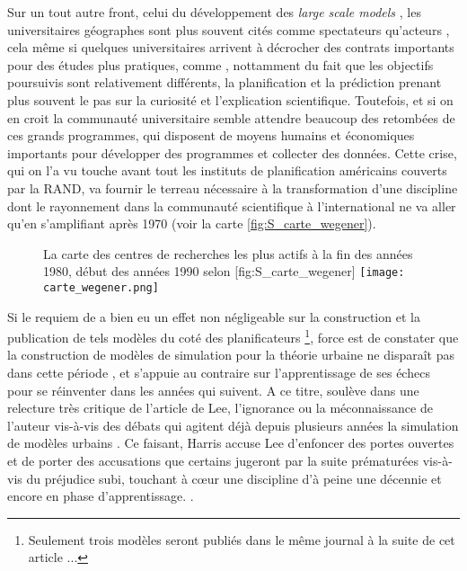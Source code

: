 Sur un tout autre front, celui du développement des \textit{large scale models} \autocites[8]{Batty1976}, les universitaires géographes sont plus souvent cités comme spectateurs qu'acteurs \autocites[9]{Batty1994}[153]{Batty1989}, cela même si quelques universitaires arrivent à décrocher des contrats importants \autocite{Barnes2006a} pour des études plus pratiques, comme \textcite{Garrison1959}, nottamment du fait que les objectifs poursuivis sont relativement différents, la planification et la prédiction prenant plus souvent le pas sur la curiosité et l'explication scientifique. Toutefois, et si on en croit \textcite{Haggett1969} la communauté universitaire semble attendre beaucoup des retombées de ces grands programmes, qui disposent de moyens humains et économiques importants pour développer des programmes et collecter des données. Cette crise, qui on l'a vu touche avant tout les instituts de planification américains couverts par la RAND, va fournir le terreau nécessaire à la transformation d'une discipline dont le rayonnement dans la communauté scientifique à l'international ne va aller qu'en s'amplifiant après 1970 (voir la carte \ref{fig:S_carte_wegener}).

\begin{figure}[h]
\begin{sidecaption}[fortoc]{La carte des centres de recherches les plus actifs à la fin des années 1980, début des années 1990 selon \textcite{Wegener1994}}[fig:S_carte_wegener]
  \centering
 \texttt{[image: carte\_wegener.png]}
  \end{sidecaption}
\end{figure}

Si le requiem de \textcite{Lee1973} a bien eu un effet non négligeable sur la construction et la publication de tels modèles du coté des planificateurs \footnote{Seulement trois modèles seront publiés dans le même journal à la suite de cet article ...}, force est de constater que la construction de modèles de simulation pour la théorie urbaine ne disparaît pas dans cette période \autocite[11-12]{Batty1994}, et s'appuie au contraire sur l'apprentissage de ses échecs pour se réinventer dans les années qui suivent. A ce titre, \textcite{Harris1994} soulève dans une relecture très critique de l'article de Lee, l'ignorance ou la méconnaissance de l'auteur vis-à-vis des débats qui agitent déjà depuis plusieurs années la simulation de modèles urbains \autocites{Batty1971, Wilson1970, Orcutt1957, Harris1968}. Ce faisant, Harris accuse Lee d'enfoncer des portes ouvertes et de porter des accusations que certains jugeront par la suite prématurées vis-à-vis du préjudice subi, touchant à cœur une discipline d'à peine une décennie et encore en phase d'apprentissage. \autocite[p11]{Batty1994}.

